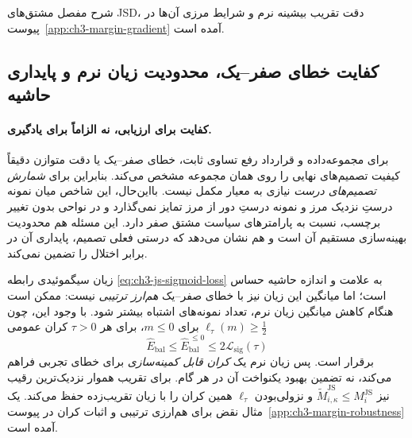 شرح مفصل مشتق‌های
JSD، دقت تقریب
بیشینه نرم و شرایط
مرزی آن‌ها در
پیوست~\ref{app:ch3-margin-gradient}
آمده است.



\subsection{کفایت خطای صفر--یک، محدودیت زیان نرم و پایداری حاشیه}
\label{subsec:ch3-margin-robustness}

\paragraph{کفایت برای ارزیابی، نه الزاماً برای یادگیری.}
برای مجموعه‌داده و قرارداد رفع تساوی ثابت،
خطای صفر--یک یا دقت متوازن دقیقاً
کیفیت تصمیم‌های نهایی را روی همان مجموعه مشخص می‌کند.
بنابراین برای \emph{شمارش تصمیم‌های درست} نیازی
به معیار مکمل نیست. بااین‌حال، این شاخص میان
نمونه درستِ نزدیک مرز و نمونه درستِ دور از مرز
تمایز نمی‌گذارد و در نواحی بدون تغییر برچسب،
نسبت به پارامترهای سیاست مشتق صفر دارد.
این مسئله هم محدودیت بهینه‌سازی مستقیم آن است
و هم نشان می‌دهد که درستی فعلی تصمیم،
پایداری آن در برابر اختلال را تضمین نمی‌کند.

زیان سیگموئیدی رابطه
\eqref{eq:ch3-js-sigmoid-loss}
به علامت و اندازه حاشیه حساس است؛
اما میانگین این زیان نیز با خطای صفر--یک
\emph{هم‌ارز ترتیبی} نیست:
ممکن است هنگام کاهش میانگین زیان نرم،
تعداد نمونه‌های اشتباه بیشتر شود.
با وجود این، چون
$\ell_\tau(m)\ge\tfrac12$ برای $m\le0$،
برای هر $\tau>0$ کران عمومی
\begin{equation}\label{eq:ch3-margin-sigmoid-error-bound}
\boxed{
\widehat E_{\mathrm{bal}}
\le \widehat E_{\mathrm{bal}}^{\,\le0}
\le 2\mathcal L_{\mathrm{sig}}(\tau)
}
\end{equation}
برقرار است. پس زیان نرم یک \emph{کران قابل کمینه‌سازی}
برای خطای تجربی فراهم می‌کند، نه تضمین
بهبود یکنواخت آن در هر گام.
برای تقریب هموار نزدیک‌ترین رقیب نیز
$\widetilde M_{i,\kappa}^{\mathrm{JS}}\le M_i^{\mathrm{JS}}$
و نزولی‌بودن $\ell_\tau$
همین کران را با زیان تقریب‌زده حفظ می‌کند.
یک مثال نقض برای هم‌ارزی ترتیبی
و اثبات کران در پیوست~\ref{app:ch3-margin-robustness}
آمده است.

